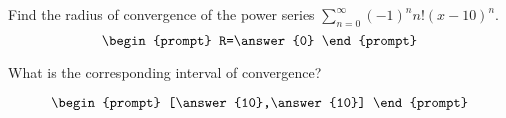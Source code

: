 \documentclass{ximera}
\author{Gregory Hartman \and Matthew Carr}
\begin{document}
\begin{exercise}




Find the radius of convergence of the power series $\sum_{n=0}^{\infty}(-1)^{n} n! (x-10)^{n}$.
\[
\begin{prompt}
R=\answer{0}
\end{prompt}
\]

What is the corresponding interval of convergence?

\[
\begin{prompt}
[\answer{10},\answer{10}]
\end{prompt}
\]

\end{exercise}
\end{document}
